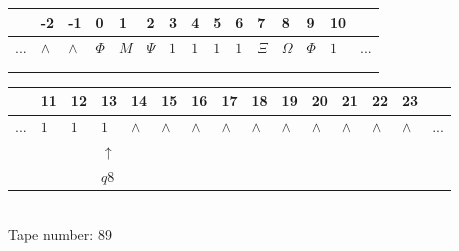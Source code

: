 \documentclass[11pt]{article}
\begin{document}
\begin{table}[H]
\centering
\begin{tabular}{lllllllllllllll}
 & -2 & -1 & 0 & 1 & 2 & 3 & 4 & 5 & 6 & 7 & 8 & 9 & 10 & \\
\hline
$...$ & \multicolumn{1}{|l|}{$\wedge$} & \multicolumn{1}{|l|}{$\wedge$} & \multicolumn{1}{|l|}{$\Phi$} & \multicolumn{1}{|l|}{$M$} & \multicolumn{1}{|l|}{$\Psi$} & \multicolumn{1}{|l|}{$1$} & \multicolumn{1}{|l|}{$1$} & \multicolumn{1}{|l|}{$1$} & \multicolumn{1}{|l|}{$1$} & \multicolumn{1}{|l|}{$\Xi$} & \multicolumn{1}{|l|}{$\Omega$} & \multicolumn{1}{|l|}{$\Phi$} & \multicolumn{1}{|l|}{$1$} & $...$\\
\hline
&  &  &  &  &  &  &  &  &  &  &  &  &  &  \\
&  &  &  &  &  &  &  &  &  &  &  &  &  &  \\
\end{tabular}
\begin{tabular}{lllllllllllllll}
 & 11 & 12 & 13 & 14 & 15 & 16 & 17 & 18 & 19 & 20 & 21 & 22 & 23 & \\
\hline
$...$ & \multicolumn{1}{|l|}{$1$} & \multicolumn{1}{|l|}{$1$} & \multicolumn{1}{|l|}{$1$} & \multicolumn{1}{|l|}{$\wedge$} & \multicolumn{1}{|l|}{$\wedge$} & \multicolumn{1}{|l|}{$\wedge$} & \multicolumn{1}{|l|}{$\wedge$} & \multicolumn{1}{|l|}{$\wedge$} & \multicolumn{1}{|l|}{$\wedge$} & \multicolumn{1}{|l|}{$\wedge$} & \multicolumn{1}{|l|}{$\wedge$} & \multicolumn{1}{|l|}{$\wedge$} & \multicolumn{1}{|l|}{$\wedge$} & $...$\\
\hline
&  &  & $\uparrow$ &  &  &  &  &  &  &  &  &  &  &  \\
&  &  & $ q8 $ &  &  &  &  &  &  &  &  &  &  &  \\
\end{tabular}
\\
Tape number: 89
\noindent\makebox[\linewidth]{\hdashrule{\textwidth}{1pt}{1pt}}\end{table}
\end{document}
